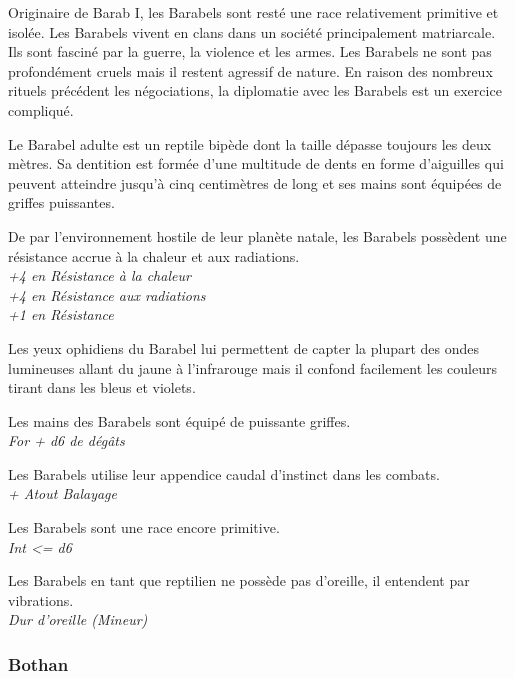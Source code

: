 Originaire de Barab I, les Barabels sont resté une race relativement primitive et isolée. Les Barabels vivent en clans dans un société principalement matriarcale. Ils sont fasciné par la guerre, la violence et les armes. Les Barabels ne sont pas profondément cruels mais il restent agressif de nature. En raison des nombreux rituels précédent les négociations, la diplomatie avec les Barabels est un exercice compliqué.

Le Barabel adulte est un reptile bipède dont la taille dépasse toujours les deux mètres. Sa dentition est formée d'une multitude de dents en forme d'aiguilles qui peuvent atteindre jusqu'à cinq centimètres de long et ses mains sont équipées de griffes puissantes.

\begin{description}[align=left]
\item [Enfance difficile] 	%
		De par l'environnement hostile de leur planète natale, les Barabels possèdent une résistance accrue à la chaleur et aux radiations.\\
		\emph{+4 en Résistance à la chaleur}\\
		\emph{+4 en Résistance aux radiations}\\
		\emph{+1 en Résistance}\\
\item [\OE{il} Ophidien] 	%
		Les yeux ophidiens du Barabel lui permettent de capter la plupart des ondes lumineuses allant du jaune à l'infrarouge mais il confond facilement les couleurs tirant dans les bleus et violets.
\item [Arme naturelle]		%
		Les mains des Barabels sont équipé de puissante griffes.\\
		\emph{For + d6 de dégâts}
\item [Balayage]			%
		Les Barabels utilise leur appendice caudal d'instinct dans les combats.\\
		\emph{+ Atout Balayage}
\item [Primitif]			%
		Les Barabels sont une race encore primitive.\\
		\emph{Int <= d6}
\item [Dur d'oreille]		%
		Les Barabels en tant que reptilien ne possède pas d'oreille, il entendent par vibrations.\\
		\emph{Dur d'oreille (Mineur)}
\end{description}


\subsubsection{Bothan}

